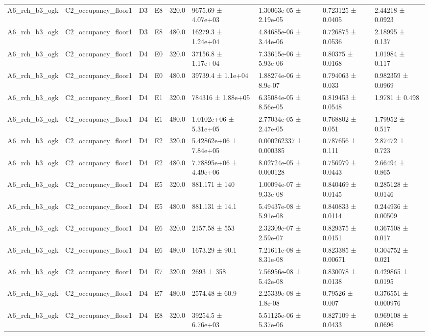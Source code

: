 \begin{table}
\begin{tabular}{lllllllll}
A6\_rch\_b3\_ogk & C2\_occupancy\_floor1 & D3 & E8 & 320.0 & 9675.69 ± 4.07e+03 & 1.30063e-05 ± 2.19e-05 & 0.723125 ± 0.0405 & 2.44218 ± 0.0923 \\
A6\_rch\_b3\_ogk & C2\_occupancy\_floor1 & D3 & E8 & 480.0 & 16279.3 ± 1.24e+04 & 4.84685e-06 ± 3.44e-06 & 0.726875 ± 0.0536 & 2.18995 ± 0.137 \\
A6\_rch\_b3\_ogk & C2\_occupancy\_floor1 & D4 & E0 & 320.0 & 37156.8 ± 1.17e+04 & 7.33615e-06 ± 5.93e-06 & 0.80375 ± 0.0168 & 1.01984 ± 0.117 \\
A6\_rch\_b3\_ogk & C2\_occupancy\_floor1 & D4 & E0 & 480.0 & 39739.4 ± 1.1e+04 & 1.88274e-06 ± 8.9e-07 & 0.794063 ± 0.033 & 0.982359 ± 0.0969 \\
A6\_rch\_b3\_ogk & C2\_occupancy\_floor1 & D4 & E1 & 320.0 & 784316 ± 1.88e+05 & 6.35084e-05 ± 8.56e-05 & 0.819453 ± 0.0548 & 1.9781 ± 0.498 \\
A6\_rch\_b3\_ogk & C2\_occupancy\_floor1 & D4 & E1 & 480.0 & 1.0102e+06 ± 5.31e+05 & 2.77034e-05 ± 2.47e-05 & 0.768802 ± 0.051 & 1.79952 ± 0.517 \\
A6\_rch\_b3\_ogk & C2\_occupancy\_floor1 & D4 & E2 & 320.0 & 5.42862e+06 ± 7.84e+05 & 0.000262337 ± 0.000385 & 0.787656 ± 0.111 & 2.87472 ± 0.723 \\
A6\_rch\_b3\_ogk & C2\_occupancy\_floor1 & D4 & E2 & 480.0 & 7.78895e+06 ± 4.49e+06 & 8.02724e-05 ± 0.000128 & 0.756979 ± 0.0443 & 2.66494 ± 0.865 \\
A6\_rch\_b3\_ogk & C2\_occupancy\_floor1 & D4 & E5 & 320.0 & 881.171 ± 140 & 1.00094e-07 ± 9.33e-08 & 0.840469 ± 0.0145 & 0.285128 ± 0.0146 \\
A6\_rch\_b3\_ogk & C2\_occupancy\_floor1 & D4 & E5 & 480.0 & 881.131 ± 14.1 & 5.49437e-08 ± 5.91e-08 & 0.840833 ± 0.0114 & 0.244936 ± 0.00509 \\
A6\_rch\_b3\_ogk & C2\_occupancy\_floor1 & D4 & E6 & 320.0 & 2157.58 ± 553 & 2.32309e-07 ± 2.59e-07 & 0.829375 ± 0.0151 & 0.367508 ± 0.017 \\
A6\_rch\_b3\_ogk & C2\_occupancy\_floor1 & D4 & E6 & 480.0 & 1673.29 ± 90.1 & 7.21611e-08 ± 8.31e-08 & 0.823385 ± 0.00671 & 0.304752 ± 0.021 \\
A6\_rch\_b3\_ogk & C2\_occupancy\_floor1 & D4 & E7 & 320.0 & 2693 ± 358 & 7.56956e-08 ± 5.42e-08 & 0.830078 ± 0.0138 & 0.429865 ± 0.0195 \\
A6\_rch\_b3\_ogk & C2\_occupancy\_floor1 & D4 & E7 & 480.0 & 2574.48 ± 60.9 & 2.25339e-08 ± 1.8e-08 & 0.79526 ± 0.007 & 0.376551 ± 0.000976 \\
A6\_rch\_b3\_ogk & C2\_occupancy\_floor1 & D4 & E8 & 320.0 & 39254.5 ± 6.76e+03 & 5.51125e-06 ± 5.37e-06 & 0.827109 ± 0.0433 & 0.969108 ± 0.0696 \\

\end{tabular}
\end{table}
